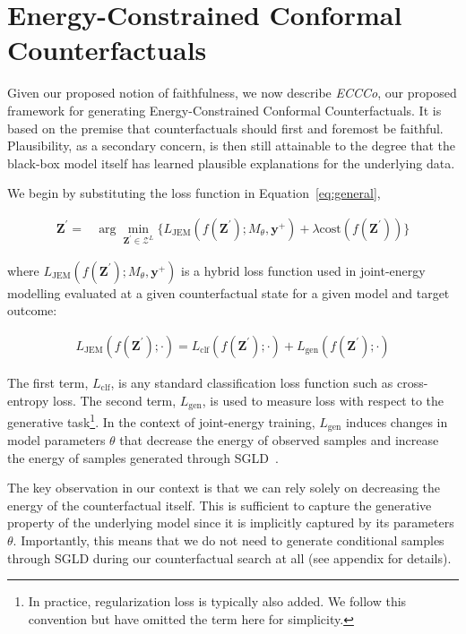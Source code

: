 \documentclass[letterpaper]{article} %
\begin{document}
\section{Energy-Constrained Conformal Counterfactuals}\label{meth}

Given our proposed notion of faithfulness, we now describe \textit{ECCCo}, our proposed framework for generating Energy-Constrained Conformal Counterfactuals. It is based on the premise that counterfactuals should first and foremost be faithful. Plausibility, as a secondary concern, is then still attainable to the degree that the black-box model itself has learned plausible explanations for the underlying data. 

We begin by substituting the loss function in Equation~\ref{eq:general},

\begin{equation} \label{eq:eccco-start}
  \begin{aligned}
  \mathbf{Z}^\prime =& \arg \min_{\mathbf{Z}^\prime \in \mathcal{Z}^L} \{  {L_{\text{JEM}}(f(\mathbf{Z}^\prime);M_{\theta},\mathbf{y}^+)}+ \lambda {\text{cost}(f(\mathbf{Z}^\prime)) } \} 
  \end{aligned} 
\end{equation}

where $L_{\text{JEM}}(f(\mathbf{Z}^\prime);M_{\theta},\mathbf{y}^+)$ is a hybrid loss function used in joint-energy modelling evaluated at a given counterfactual state for a given model and target outcome:

\begin{equation}
  \begin{aligned}
    L_{\text{JEM}}(f(\mathbf{Z}^\prime); \cdot) = L_{\text{clf}}(f(\mathbf{Z}^\prime); \cdot) + L_{\text{gen}}(f(\mathbf{Z}^\prime); \cdot)
  \end{aligned}
\end{equation}

The first term, $L_{\text{clf}}$, is any standard classification loss function such as cross-entropy loss. The second term, $L_{\text{gen}}$, is used to measure loss with respect to the generative task\footnote{In practice, regularization loss is typically also added. We follow this convention but have omitted the term here for simplicity.}. In the context of joint-energy training, $L_{\text{gen}}$ induces changes in model parameters $\theta$ that decrease the energy of observed samples and increase the energy of samples generated through SGLD~\citep{du2019implicit}. 

The key observation in our context is that we can rely solely on decreasing the energy of the counterfactual itself. This is sufficient to capture the generative property of the underlying model since it is implicitly captured by its parameters $\theta$. Importantly, this means that we do not need to generate conditional samples through SGLD during our counterfactual search at all (see appendix for details).
\end{document}
